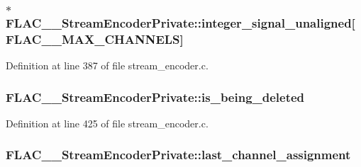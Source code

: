 \subsubsection[{\texorpdfstring{integer\+\_\+signal\+\_\+unaligned}{integer_signal_unaligned}}]{$\ast$ F\+L\+A\+C\+\_\+\+\_\+\+Stream\+Encoder\+Private\+::integer\+\_\+signal\+\_\+unaligned\mbox{[}{\bf F\+L\+A\+C\+\_\+\+\_\+\+M\+A\+X\+\_\+\+C\+H\+A\+N\+N\+E\+LS}\mbox{]}}\hypertarget{struct_f_l_a_c_____stream_encoder_private_a95806af8c783db29c9f4d172aba69c2e}{}\label{struct_f_l_a_c_____stream_encoder_private_a95806af8c783db29c9f4d172aba69c2e}


Definition at line 387 of file stream\+\_\+encoder.\+c.

\subsubsection[{\texorpdfstring{is\+\_\+being\+\_\+deleted}{is_being_deleted}}]{ F\+L\+A\+C\+\_\+\+\_\+\+Stream\+Encoder\+Private\+::is\+\_\+being\+\_\+deleted}\hypertarget{struct_f_l_a_c_____stream_encoder_private_aa9e56cb0a654ea4a3cb1702a244ab65b}{}\label{struct_f_l_a_c_____stream_encoder_private_aa9e56cb0a654ea4a3cb1702a244ab65b}


Definition at line 425 of file stream\+\_\+encoder.\+c.

\subsubsection[{\texorpdfstring{last\+\_\+channel\+\_\+assignment}{last_channel_assignment}}]{ F\+L\+A\+C\+\_\+\+\_\+\+Stream\+Encoder\+Private\+::last\+\_\+channel\+\_\+assignment}\hypertarget{struct_f_l_a_c_____stream_encoder_private_ac1d1aa817c3b1f5e7975a61dcb69f392}{}\label{struct_f_l_a_c_____stream_encoder_private_ac1d1aa817c3b1f5e7975a61dcb69f392}


